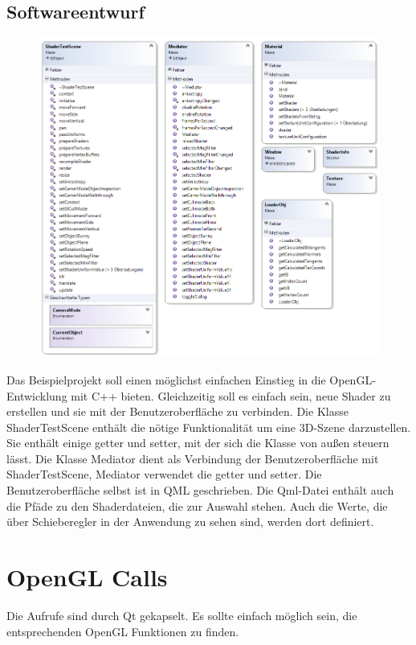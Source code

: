\documentclass[a4paper,12pt]{article}
\begin{document}
\subsection{Softwareentwurf}
\begin{figure}
	\centering
		\includegraphics[width=\textwidth,height=\textheight,keepaspectratio]{Bilder/Klassendiagramm.png}
	\label{fig:Klassendiagramm}
\end{figure}
Das Beispielprojekt soll einen möglichst einfachen Einstieg in die OpenGL-Entwicklung mit C++ bieten. Gleichzeitig soll es einfach sein, neue Shader zu erstellen und sie mit der Benutzeroberfläche zu verbinden. Die Klasse ShaderTestScene enthält die nötige Funktionalität um eine 3D-Szene darzustellen. Sie enthält einige getter und setter, mit der sich die Klasse von außen steuern lässt. Die Klasse Mediator dient als Verbindung der Benutzeroberfläche mit ShaderTestScene, Mediator verwendet die getter und setter. Die Benutzeroberfläche selbst ist in QML geschrieben. Die Qml-Datei enthält auch die Pfäde zu den Shaderdateien, die zur Auswahl stehen. Auch die Werte, die über Schieberegler in der Anwendung zu sehen sind, werden dort definiert.

\section{OpenGL Calls}
Die Aufrufe sind durch Qt gekapselt. Es sollte einfach möglich sein, die entsprechenden OpenGL Funktionen zu finden.
\end{document}

